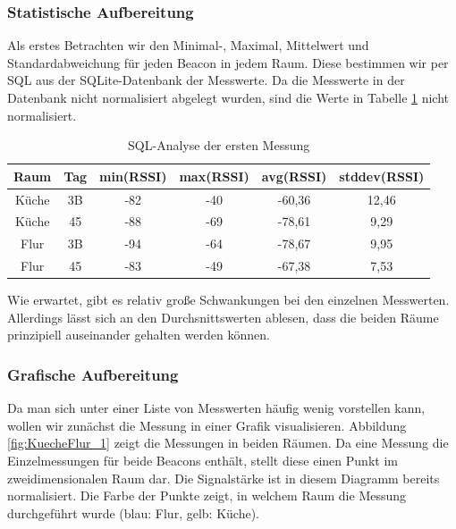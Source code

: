 \subsubsection{Statistische Aufbereitung}

Als erstes Betrachten wir den Minimal-, Maximal, Mittelwert und Standardabweichung für jeden
Beacon in jedem Raum. Diese bestimmen wir per SQL aus der SQLite-Datenbank der Messwerte.
Da die Messwerte in der Datenbank nicht normalisiert abgelegt wurden, sind die Werte
in Tabelle \ref{tab:sql-analyze} nicht normalisiert.

\begin{table}[h]
	\caption{SQL-Analyse der ersten Messung}
	\label{tab:sql-analyze}
	\begin{tabular}{|c|c|c|c|c|c|}
		\hline \textbf{Raum} & \textbf{Tag} & \textbf{min(RSSI)} & \textbf{max(RSSI)} & \textbf{avg(RSSI)} & \textbf{stddev(RSSI)} \\
		\hline 
		\hline Küche  & 3B & -82 & -40 & -60,36 & 12,46 \\ 
		\hline Küche & 45 & -88 & -69 & -78,61 & 9,29 \\ 
		\hline Flur & 3B & -94 & -64 & -78,67 & 9,95 \\ 
		\hline Flur & 45 & -83 & -49 & -67,38 & 7,53 \\ 
		\hline 
	\end{tabular}
\end{table}


\vspace{0.4cm}
Wie erwartet, gibt es relativ große Schwankungen bei den einzelnen Messwerten.
Allerdings lässt sich an den Durchsnittswerten ablesen, dass die beiden Räume
prinzipiell auseinander gehalten werden können.

\subsubsection{Grafische Aufbereitung}
\label{sec:lok-grafische-aufbereitung}

Da man sich unter einer Liste von Messwerten häufig wenig vorstellen kann,
wollen wir zunächst die Messung in einer Grafik visualisieren.
Abbildung \ref{fig:KuecheFlur_1} zeigt die Messungen in beiden Räumen.
Da eine Messung die Einzelmessungen für beide Beacons enthält, stellt diese
einen Punkt im zweidimensionalen Raum dar. Die Signalstärke ist in diesem
Diagramm bereits normalisiert. Die Farbe der Punkte zeigt, in welchem Raum
die Messung durchgeführt wurde (blau: Flur, gelb: Küche).

